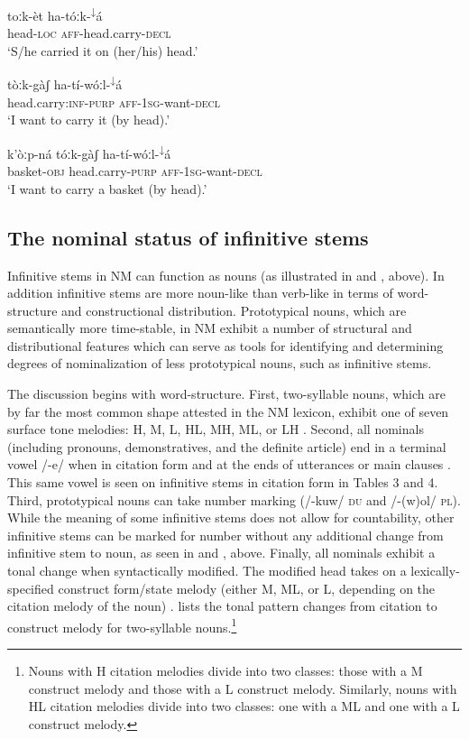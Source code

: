 \documentclass[output=paper]{langsci/langscibook}
\begin{document}
\ea\label{ex:mahland:21}
\gll toːk-\`{e}t       ha-t\'{o}ːk-\textsuperscript{↓}\'{a}\\
head-\textsc{loc}   \textsc{aff}{}-head.carry-\textsc{decl} \\
\glt `S/he carried it on (her/his) head.'
\z

\ea\label{ex:mahland:22}
\gll t\`{o}ːk-g\`{a}ʃ                    ha-t\'{i}-w\'{o}ːl-\textsuperscript{↓}\'{a}\\
head.carry:\textsc{inf-purp}   \textsc{aff-1sg}{}-want-\textsc{decl} \\
\glt `I want to carry it (by head).'
\z

\ea\label{ex:mahland:23}
\gll k'\`{o}ːp-n\'{a}      t\'{o}ːk-g\`{a}ʃ               ha-t\'{i}-w\'{o}ːl-\textsuperscript{↓}\'{a}\\
basket\textsc{{}-obj}   head.carry\textsc{{}-purp}   \textsc{aff-1sg}{}-want\textsc{{}-decl }\\
\glt `I want to carry a basket (by head).'
\z

\subsection{The nominal status of infinitive stems}\label{sec:mahland:1.4}

Infinitive stems in NM can function as nouns (as illustrated in  and , above). In addition infinitive stems are more noun-like than verb-like in terms of word-structure and constructional distribution. Prototypical nouns, which are semantically more time-stable, in NM exhibit a number of structural and distributional features which can serve as tools for identifying and determining degrees of nominalization of less prototypical nouns, such as infinitive stems. 


The discussion begins with word-structure. First, two-syllable nouns, which are by far the most common shape attested in the NM lexicon, exhibit one of seven surface tone melodies: H, M, L, HL, MH, ML, or LH \citep[23]{Ahland2009}. Second, all nominals (including pronouns, demonstratives, and the definite article) end in a terminal vowel /-e/ when in citation form and at the ends of utterances or main clauses \citep[194, 313]{Ahland2012}. This same vowel is seen on infinitive stems in citation form in Tables 3 and 4. Third, prototypical nouns can take number marking (/-kuw/ \textsc{du} and /-(w)ol/ \textsc{pl}). While the meaning of some infinitive stems does not allow for countability, other infinitive stems can be marked for number without any additional change from infinitive stem to noun, as seen in  and , above. Finally, all nominals exhibit a tonal change when syntactically modified. The modified head takes on a lexically-specified construct form/state melody (either M, ML, or L, depending on the citation melody of the noun) \citep[146]{Ahland2012}.  lists the tonal pattern changes from citation to construct melody for two-syllable nouns.\footnote{Nouns with H citation melodies divide into two classes: those with a M construct melody and those with a L construct melody. Similarly, nouns with HL citation melodies divide into two classes: one with a ML and one with a L construct melody.}
\end{document}
